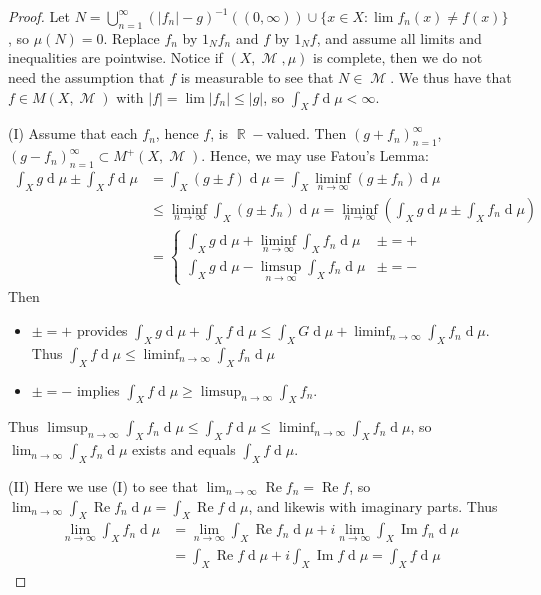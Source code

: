 \documentclass[12pt, a4paper]{memoir}
\DeclareMathOperator{\R}{{\mathbb{R}}}
\theoremstyle{nonumberplain}
\newtheorem{proof}{Proof}
\DeclareMathOperator{\M}{\mathcal{M}}
\renewcommand{\Re}{\ensuremath{\operatorname{Re}}}
\renewcommand{\Im}{\ensuremath{\operatorname{Im}}}
\renewcommand{\d}[1]{\ensuremath{\operatorname{d}\!{#1}}} %
\begin{document}
\begin{proof}
    Let $N=\bigcup_{n=1}^\infty(|f_n|-g)^{-1}((0,\infty))\cup\{x\in X:\lim f_n(x)\neq f(x)\}$, so $\mu(N)=0$.
    Replace $f_n$ by $1_Nf_n$ and $f$ by $1_Nf$, and assume all limits and inequalities are pointwise.
    Notice if $(X,\M,\mu)$ is complete, then we do not need the assumption that $f$ is measurable to see that $N\in\M$.
    We thus have that $f\in M(X,\M)$ with $|f|=\lim|f_n|\leq |g|$, so $\int_X f\d{\mu}<\infty$.

    (I) Assume that each $f_n$, hence $f$, is $\R-$valued.
    Then $(g+f_n)_{n=1}^\infty$, $(g-f_n)_{n=1}^\infty\subset M^+(X,\M)$.
    Hence, we may use Fatou's Lemma:
    \begin{align*}
        \int_X g\d{\mu}\pm\int_X f\d{\mu} &= \int_X(g\pm f)\d{\mu}=\int_X\liminf_{n\to\infty}(g\pm f_n)\d{\mu}\\
                                          &\leq\liminf_{n\to\infty}\int_X(g\pm f_n)\d{\mu}=\liminf_{n\to\infty}\left(\int_X g\d{\mu}\pm\int_X f_n\d{\mu}\right)\\
                                          &=
        \begin{cases}
            \int_X g\d{\mu}+\liminf_{n\to\infty}\int_X f_n\d{\mu} &\pm=+\\
            \int_X g\d{\mu}-\limsup_{n\to\infty}\int_X f_n\d{\mu} &\pm=-
        \end{cases}
    \end{align*}
    Then
    \begin{itemize}[nolistsep]
        \item $\pm=+$ provides $\int_Xg\d{\mu}+\int_X f\d{\mu}\leq\int_XG\d{\mu}+\liminf_{n\to\infty}\int_Xf_n\d{\mu}$.
            Thus $\int_Xf\d{\mu}\leq\liminf_{n\to\infty}\int_X f_n\d{\mu}$
        \item $\pm=-$ implies $\int_X f\d{\mu}\geq\limsup_{n\to\infty}\int_X f_n$.
    \end{itemize}
    Thus $\limsup_{n\to\infty}\int_Xf_n\d{\mu}\leq\int_Xf\d{\mu}\leq\liminf_{n\to\infty}\int_Xf_n\d{\mu}$, so $\lim_{n\to\infty}\int_Xf_n\d{\mu}$ exists and equals $\int_Xf\d{\mu}$.

    (II) Here we use (I) to see that $\lim_{n\to\infty}\Re f_n=\Re f$, so $\lim_{n\to\infty}\int_X\Re f_n\d{\mu}=\int_X\Re f\d{\mu}$, and likewis with imaginary parts.
    Thus
    \begin{align*}
        \lim_{n\to\infty}\int_Xf_n\d{\mu} &= \lim_{n\to\infty}\int_X\Re f_n\d{\mu}+i\lim_{n\to\infty}\int_X\Im f_n\d{\mu}\\
                                         &= \int_X\Re f\d{\mu}+i\int_X\Im f\d{\mu}=\int_X f\d{\mu}
    \end{align*}
\end{proof}
\end{document}
